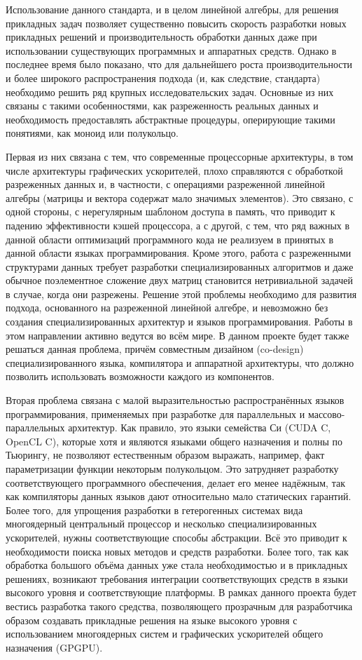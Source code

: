 \documentclass[12pt]{article}  %
\theoremstyle{remark}
\begin{document}
Использование данного стандарта, и в целом линейной алгебры, для решения прикладных задач позволяет существенно повысить скорость разработки новых прикладных решений и производительность обработки данных даже при использовании существующих программных и аппаратных средств. Однако в последнее время было показано, что для дальнейшего роста производительности и более широкого распространения подхода (и, как следствие, стандарта) необходимо решить ряд крупных исследовательских задач. Основные из них связаны с такими особенностями, как разреженность реальных данных и необходимость предоставлять абстрактные процедуры, оперирующие такими понятиями, как моноид или полукольцо.

Первая из них связана с тем, что современные процессорные архитектуры, в том числе архитектуры графических ускорителей, плохо справляются с обработкой разреженных данных и, в частности, с операциями разреженной линейной алгебры (матрицы и вектора содержат мало значимых элементов). Это связано, с одной стороны, с нерегулярным шаблоном доступа в память, что приводит к падению эффективности кэшей процессора, а с другой, с тем, что ряд важных в данной области оптимизаций программного кода не реализуем в принятых в данной области языках программирования. Кроме этого, работа с разреженными структурами данных требует разработки специализированных алгоритмов и даже обычное поэлементное сложение двух матриц становится нетривиальной задачей в случае, когда они разрежены. Решение этой проблемы необходимо для развития подхода, основанного на разреженной линейной алгебре, и невозможно без создания специализированных архитектур и языков программирования. Работы в этом направлении активно ведутся во всём мире. В данном проекте будет также решаться данная проблема, причём совместным дизайном (co-design) специализированного языка, компилятора и аппаратной архитектуры, что должно позволить использовать возможности каждого из компонентов. 

Вторая проблема связана с малой выразительностью распространённых языков программирования, применяемых при разработке для параллельных и массово-параллельных архитектур. Как правило, это языки семейства Си (CUDA C, OpenCL C), которые хотя и являются языками общего назначения и полны по Тьюрингу, не позволяют естественным образом выражать, например, факт параметризации функции некоторым полукольцом. Это затрудняет разработку соответствующего программного обеспечения, делает его менее надёжным, так как компиляторы данных языков дают относительно мало статических гарантий. Более того, для упрощения разработки в гетерогенных системах вида многоядерный центральный процессор и несколько специализированных ускорителей, нужны соответствующие способы абстракции. Всё это приводит к необходимости поиска новых методов и средств разработки. Более того, так как обработка большого объёма данных уже стала необходимостью и в прикладных решениях, возникают требования интеграции соответствующих средств в языки высокого уровня и соответствующие платформы. В рамках данного проекта будет вестись разработка такого средства, позволяющего прозрачным для разработчика образом создавать прикладные решения на языке высокого уровня с использованием многоядерных систем и графических ускорителей общего назначения (GPGPU).
\end{document}
